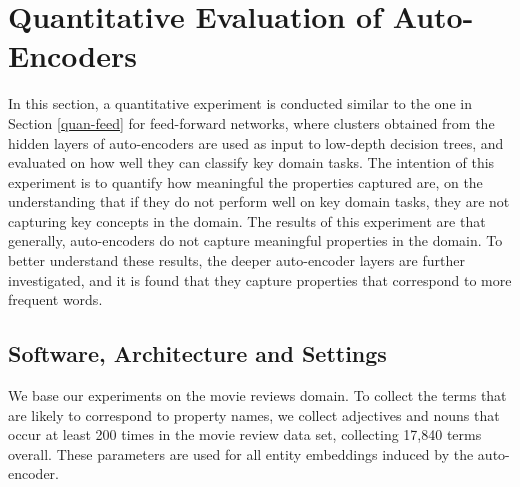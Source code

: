 








\section{Quantitative Evaluation of Auto-Encoders}\label{auto-quan}

In this section, a quantitative experiment is conducted similar to the one in Section \ref{quan-feed} for feed-forward networks, where  clusters obtained from the  hidden layers of auto-encoders are used as input to low-depth decision trees, and evaluated on how well they can classify key domain tasks. The intention of this experiment is to quantify how meaningful the properties captured are, on the understanding that if they do not perform well on key domain tasks, they are not capturing key concepts in the domain. The results of this experiment are that generally, auto-encoders do not capture meaningful properties in the domain. To better understand these results, the deeper auto-encoder layers are further investigated, and it is found that they capture properties that correspond to more frequent words. 

\subsection{Software, Architecture and Settings}

We base our experiments on the movie reviews domain. To collect the terms that are likely to correspond to property names, we collect adjectives and nouns that occur at least 200 times in the movie review data set, collecting 17,840 terms overall.  These parameters are used for all entity embeddings induced by the auto-encoder.

